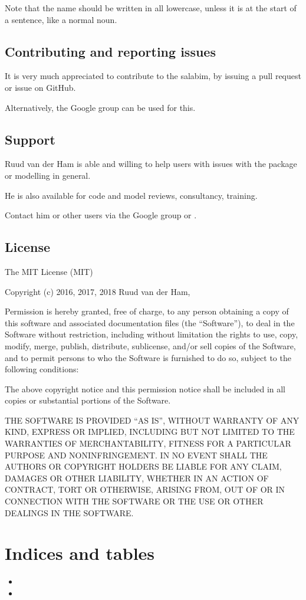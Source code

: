 \documentclass[letterpaper,10pt,english]{sphinxmanual}
\begin{document}
Note that the name should be written in all lowercase, unless it is at the start of a sentence, like a
normal noun.


\section{Contributing and reporting issues}
\label{\detokenize{About:contributing-and-reporting-issues}}
It is very much appreciated to contribute to the salabim, by issuing a pull request or issue on GitHub.

Alternatively, the Google group can be used for this.


\section{Support}
\label{\detokenize{About:support}}
Ruud van der Ham is able and willing to help users with issues with the package or modelling in general.

He is also available for code and model reviews, consultancy, training.

Contact him or other users via the Google group or .


\section{License}
\label{\detokenize{About:license}}
The MIT License (MIT)

Copyright (c) 2016, 2017, 2018 Ruud van der Ham, 

Permission is hereby granted, free of charge, to any person obtaining a copy of
this software and associated documentation files (the “Software”), to deal in
the Software without restriction, including without limitation the rights to
use, copy, modify, merge, publish, distribute, sublicense, and/or sell copies
of the Software, and to permit persons to who the Software is furnished to do
so, subject to the following conditions:

The above copyright notice and this permission notice shall be included in all
copies or substantial portions of the Software.

THE SOFTWARE IS PROVIDED “AS IS”, WITHOUT WARRANTY OF ANY KIND, EXPRESS OR
IMPLIED, INCLUDING BUT NOT LIMITED TO THE WARRANTIES OF MERCHANTABILITY,
FITNESS FOR A PARTICULAR PURPOSE AND NONINFRINGEMENT. IN NO EVENT SHALL THE
AUTHORS OR COPYRIGHT HOLDERS BE LIABLE FOR ANY CLAIM, DAMAGES OR OTHER
LIABILITY, WHETHER IN AN ACTION OF CONTRACT, TORT OR OTHERWISE, ARISING FROM,
OUT OF OR IN CONNECTION WITH THE SOFTWARE OR THE USE OR OTHER DEALINGS IN THE
SOFTWARE.


\chapter{Indices and tables}
\label{\detokenize{Indices:indices-and-tables}}\label{\detokenize{Indices::doc}}\begin{itemize}
\item {} 

\item {} 

\end{itemize}



\renewcommand{\indexname}{Index}
\printindex
\end{document}

